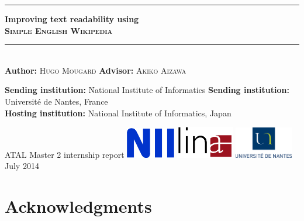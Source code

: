 \documentclass[a4paper, 11pt]{scrreprt}
\newcommand\sew{\textsc{Simple English Wikipedia}}
\begin{document}
\begin{titlepage}
  \begin{center}
    \noindent\rule{\textwidth}{0.4pt}
    {\huge\bfseries Improving text readability using\\
      \sew\\}
    \noindent\rule{\textwidth}{0.4pt}\\
    \vspace{1.5cm}
    {\large
      \textbf{Author:} \textsc{Hugo Mougard}
      \hfill
      \textbf{Advisor:} \textsc{Akiko Aizawa}}\\[5pt]
    \vfill
    \parbox{0pt}{\large \begin{tabbing}
        \textbf{Sending institution:} \= National Institute of Informatics \kill
        \textbf{Sending institution:} \> Université de Nantes, France \\
        \textbf{Hosting institution:} \> National Institute of
        Informatics, Japan \\
      \end{tabbing}}
    \vfill
    {\LARGE ATAL Master 2 internship report}
    \vfill
    \includegraphics[width=0.16\textwidth]{img/nii.png}
    \hfill
    \hfill
    \includegraphics[width=0.19\textwidth]{img/lina.png}
    \hfill
    \includegraphics[width=0.19\textwidth]{img/univ.eps}
    \vfill
    {July 2014}
  \end{center}
\end{titlepage}

\tableofcontents

\chapter{Acknowledgments}
\end{document}
